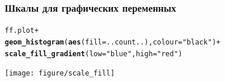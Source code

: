 \documentclass[compress]{beamer}\usepackage[]{graphicx}\usepackage[]{color}
\makeatletter
\newcommand{\hlstr}[1]{\textcolor[rgb]{0.192,0.494,0.8}{#1}}%
\newcommand{\hlopt}[1]{\textcolor[rgb]{0,0,0}{#1}}%
\newcommand{\hlstd}[1]{\textcolor[rgb]{0.345,0.345,0.345}{#1}}%
\newcommand{\hlkwc}[1]{\textcolor[rgb]{0.333,0.667,0.333}{#1}}%
\newcommand{\hlkwd}[1]{\textcolor[rgb]{0.737,0.353,0.396}{\textbf{#1}}}%
\newenvironment{kframe}{%
 \def\at@end@of@kframe{}%
 \ifinner\ifhmode%
  \def\at@end@of@kframe{\end{minipage}}%
  \begin{minipage}{\columnwidth}%
 \fi\fi%
 \def\FrameCommand##1{\hskip\@totalleftmargin \hskip-\fboxsep
 \colorbox{shadecolor}{##1}\hskip-\fboxsep
     \hskip-\linewidth \hskip-\@totalleftmargin \hskip\columnwidth}%
 \MakeFramed {\advance\hsize-\width
   \@totalleftmargin\z@ \linewidth\hsize
   \@setminipage}}%
 {\par\unskip\endMakeFramed%
 \at@end@of@kframe}
\newenvironment{knitrout}{}{} %
\makeatother
\begin{document}
\begin{frame}[fragile]
\frametitle{Шкалы для графических переменных}
\begin{knitrout}\footnotesize
{}\color{fgcolor}\begin{kframe}
\begin{alltt}
\hlstd{ff.plot} \hlopt{+}
  \hlkwd{geom_histogram}\hlstd{(}\hlkwd{aes}\hlstd{(}\hlkwc{fill} \hlstd{= ..count..),} \hlkwc{colour} \hlstd{=} \hlstr{"black"}\hlstd{)} \hlopt{+}
  \hlkwd{scale_fill_gradient}\hlstd{(}\hlkwc{low} \hlstd{=} \hlstr{"blue"}\hlstd{,} \hlkwc{high} \hlstd{=} \hlstr{"red"}\hlstd{)}
\end{alltt}
\end{kframe}
\texttt{[image: figure/scale\_fill]} 

\end{knitrout}

\end{frame}
\end{document}
